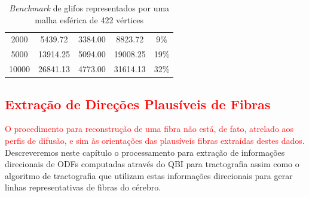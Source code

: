 \documentclass[
    12pt,                %
    oneside,            %
    a4paper,            %
    english,            %
    french,                %
    spanish,            %
    brazil                %
    ]{abntex2}
\begin{document}
\begin{table}[H]
\begin{tabular}{c|c|c|c|c}
2000                                                                     & 5439.72                                                                                              & 3384.00                                                              & 8823.72                                                                          & 9\%                                                                                               \\
5000                                                                     & 13914.25                                                                                             & 5094.00                                                              & 19008.25                                                                         & 19\%                                                                                              \\
10000                                                                    & 26841.13                                                                                             & 4773.00                                                              & 31614.13                                                                         & 32\%                                                                                             
\end{tabular}
\caption{\textit{Benchmark} de glifos representados por uma malha esférica de 422 vértices}
\label{tab::benchmark_glifos_422}
\end{table}

\textcolor{red}{\chapter{Extração de Direções Plausíveis de Fibras}}


\textcolor{red}{O procedimento para reconstrução de uma fibra não está, de fato, atrelado aos perfis de difusão, e sim às orientações das plausíveis fibras extraídas destes dados.} Descreveremos neste capítulo o processamento para extração de informações direcionais de ODFs computadas através do QBI para tractografia assim como o algoritmo de tractografia que utilizam estas informações direcionais para gerar linhas representativas de fibras do cérebro.


\end{document}
